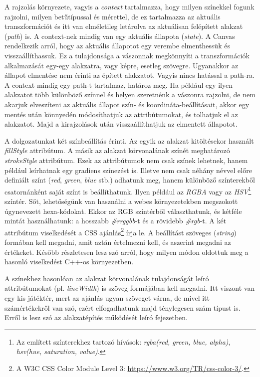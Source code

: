 \documentclass[12pt]{report}
\theoremstyle{definition}
\newcommand{\inenglish}[1]{\textsl{#1}}
\newcommand{\func}[1]{{\textsl{#1}}}
\begin{document}
A rajzolás környezete, vagyis a \emph{context} tartalmazza, hogy milyen
színekkel fogunk rajzolni, milyen betűtípussal és mérettel, de ez tartalmazza
az aktuális transzformációt és itt van elméletileg letárolva az aktuálisan
felépített alakzat (\inenglish{path}) is. A context-nek mindig van egy aktuális
állapota (\inenglish{state}). A Canvas rendelkezik arról, hogy az aktuális
állapotot egy verembe elmenthessük és visszaállíthassuk. Ez a tulajdonsága a
vászonnak megkönnyíti a transzformációk alkalmazását egy-egy alakzatra, vagy
képre, esetleg szövegre. Ugyanakkor az állapot elmentése nem érinti az épített
alakzatot. Vagyis nincs hatással a path-ra. A context mindig egy path-t
tartalmaz, határoz meg. Ha például egy ilyen alakzatot több különböző színnel
és helyen szeretnénk a vászonra rajzolni, de nem akarjuk elveszíteni az
aktuális állapot szín- és koordináta-beállításait, akkor egy mentés után
könnyedén módosíthatjuk az attribútumokat, és tolhatjuk el az alakzatot. Majd a
kirajzolások után visszaállíthatjuk az elmentett állapotot.

A dolgozatunkat két színbeállítás érinti. Az egyik az alakzat kitöltésekor
használt \func{fillStyle} attribútum. A másik az alakzat körvonalának színét
meghatározó \func{strokeStyle} attribútum. Ezek az attribútumok nem csak színek
lehetnek, hanem például leírhatnak egy gradiens színezést is. Illetve nem csak
néhány névvel előre definiált színt (\func{red}, \func{green}, \func{blue}
stb.) adhatunk meg, hanem különböző színterekből csatornánként saját színt is
beállíthatunk. Ilyen például az \emph{RGBA} vagy az \emph{HSV}\footnote{Az
említett színterekhez tartozó hívások: \func{rgba(red, green, blue, alpha)},
\func{hsv(hue, saturation, value)}.} színtér. Sőt, lehetőségünk van használni a
webes környezetekben megszokott úgynevezett hexa-kódokat. Ekkor az RGB
színtérből választhatunk, és kétféle mintát használhatunk: a hosszabb
\func{\#rrggbb}-t és a rövidebb \func{\#rgb}-t. A két attribútum viselkedését a
CSS ajánlás\footnote{A W3C CSS Color Module Level 3:{\footnotesize
\url{https://www.w3.org/TR/css-color-3/}}.} írja le. A beállítást szöveges
(\func{string}) formában kell megadni, amit aztán értelmezni kell, és aszerint
megadni az értékeket. Később részletesen lesz szó arról, hogy milyen módon
oldottuk meg a hasonló viselkedést C++-os környezetben.

A színekhez hasonlóan az alakzat körvonalának tulajdonságát leíró
attribútumokat (pl. \func{lineWidth}) is szöveg formájában kell megadni. Itt
viszont van egy kis játéktér, mert az ajánlás ugyan szöveget várna, de mivel
itt számértékekről van szó, ezért elfogadhatunk majd ténylegesen szám típust
is. Erről is lesz szó az alakzatépítés működését leíró fejezetben.
\end{document}

